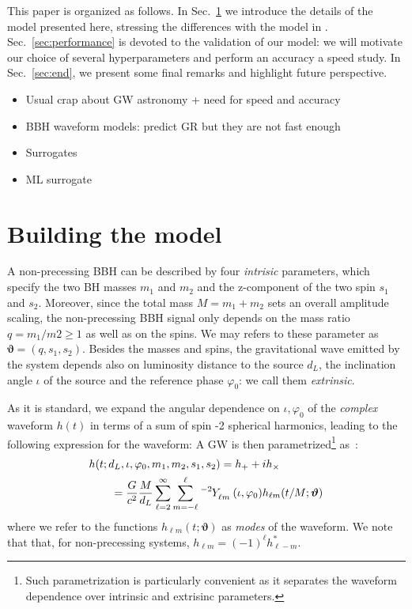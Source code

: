 \documentclass[twocolumn,showpacs,preprintnumbers,nofootinbib,prd,
superscriptaddress,10pt]{revtex4-1}
\begin{document}
This paper is organized as follows. In Sec.~\ref{sec:model} we introduce the details of the model presented here, stressing the differences with the model in  \cite{Schmidt:2020yuu}.
Sec.~\ref{sec:performance} is devoted to the validation of our model: we will motivate our choice of several hyperparameters and perform an accuracy a speed study.
In Sec.~\ref{sec:end}, we present some final remarks and highlight future perspective.

\begin{itemize}
	\item Usual crap about GW astronomy + need for speed and accuracy
	\item BBH waveform models: predict GR but they are not fast enough
	\item Surrogates
	\item ML surrogate
\end{itemize}


 \cite{Schmidt:2020yuu}

\section{Building the model}
\label{sec:model}

A non-precessing BBH can be described by four {\it intrisic} parameters, which specify the two BH masses $m_1$ and $m_2$ and the z-component of the two spin $s_1$ and $s_2$.
Moreover, since the total mass $M = m_1 + m_2$ sets an overall amplitude scaling, the non-precessing BBH signal only depends on the mass ratio $q = m_1/m2 \geq 1$ as well as on the spins. We may refers to these parameter as $\boldsymbol{\vartheta} = (q, s_1, s_2)$.
Besides the masses and spins, the gravitational wave emitted by the system depends also on luminosity distance to the source $d_L$, the inclination angle $\iota$ of the source and the reference phase $\varphi_0$: we call them {\it extrinsic}.

As it is standard, we expand the angular dependence on $\iota, \varphi_0$ of the {\it complex} waveform $h(t)$ in terms of a sum of spin -2 spherical harmonics, leading to the following expression for the waveform:
A GW is then parametrized\footnote{Such parametrization is particularly convenient as it separates the waveform dependence over intrinsic and extrisinc parameters.} as~\cite{Estelles:2021gvs}:
\begin{align} \label{eq:h_parametrization}
	&h(t; d_L,\iota,\varphi_0, m_1, m_2, s_1, s_2) = h_+ + i h_\times \nonumber \\
		&\qquad= \frac{G}{c^2} \frac{M}{d_L}\sum_{\ell = 2}^{\infty} \sum_{m = -\ell}^{\ell} \tensor[^{-2}]{Y}{_{\ell m}}(\iota, \varphi_0) h_{\ell m}(t/M; \boldsymbol{\vartheta})
\end{align}
where we refer to the functions $h_{\ell m}(t; \boldsymbol{\vartheta})$ as {\it modes} of the waveform. We note that that, for non-precessing systems, $h_{\ell m} = (-1)^\ell h^*_{\ell -m}$.
\end{document}

